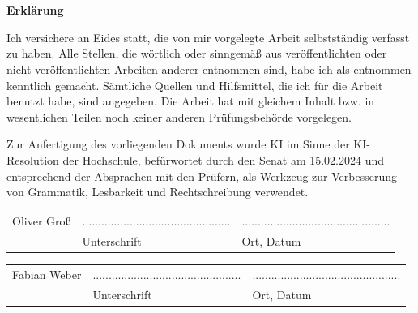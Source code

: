 \chapter*{}\label{ch:erklaerung}
\begin{center}
    \large \textbf{Erklärung}
\end{center}

Ich versichere an Eides statt, die von mir vorgelegte Arbeit selbstständig verfasst zu haben. Alle Stellen, die wörtlich oder sinngemäß aus veröffentlichten oder nicht veröffentlichten Arbeiten anderer entnommen sind, habe ich als entnommen kenntlich gemacht. Sämtliche Quellen und Hilfsmittel, die ich für die Arbeit benutzt habe, sind angegeben. Die Arbeit hat mit gleichem Inhalt bzw. in wesentlichen Teilen noch keiner anderen Prüfungsbehörde vorgelegen.

Zur Anfertigung des vorliegenden Dokuments wurde KI im Sinne der KI-Resolution der Hochschule, befürwortet durch den Senat am 15.02.2024 und entsprechend der Absprachen mit den Prüfern, als Werkzeug zur Verbesserung von Grammatik, Lesbarkeit und Rechtschreibung verwendet.

\vspace{2\baselineskip}

\begin{tabular}{p{2.5cm}p{5cm}p{5cm}}
    Oliver Groß & ............................................... & ............................................... \\
    & Unterschrift                               & Ort, Datum
\end{tabular}

\vspace{4\baselineskip}

\begin{tabular}{p{2.5cm}p{5cm}p{5cm}}
    Fabian Weber & ............................................... & ............................................... \\
    & Unterschrift                               & Ort, Datum
\end{tabular}
